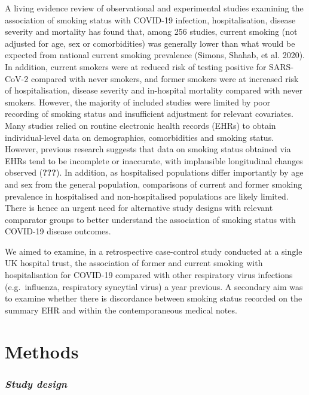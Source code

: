 \documentclass[
]{article}
\begin{document}
A living evidence review of observational and experimental studies
examining the association of smoking status with COVID-19 infection,
hospitalisation, disease severity and mortality has found that, among
256 studies, current smoking (not adjusted for age, sex or
comorbidities) was generally lower than what would be expected from
national current smoking prevalence (Simons, Shahab, et al. 2020). In
addition, current smokers were at reduced risk of testing positive for
SARS-CoV-2 compared with never smokers, and former smokers were at
increased risk of hospitalisation, disease severity and in-hospital
mortality compared with never smokers. However, the majority of included
studies were limited by poor recording of smoking status and
insufficient adjustment for relevant covariates. Many studies relied on
routine electronic health records (EHRs) to obtain individual-level data
on demographics, comorbidities and smoking status. However, previous
research suggests that data on smoking status obtained via EHRs tend to
be incomplete or inaccurate, with implausible longitudinal changes
observed ({\textbf{???}}). In addition, as hospitalised populations
differ importantly by age and sex from the general population,
comparisons of current and former smoking prevalence in hospitalised and
non-hospitalised populations are likely limited. There is hence an
urgent need for alternative study designs with relevant comparator
groups to better understand the association of smoking status with
COVID-19 disease outcomes.

We aimed to examine, in a retrospective case-control study conducted at
a single UK hospital trust, the association of former and current
smoking with hospitalisation for COVID-19 compared with other
respiratory virus infections (e.g.~influenza, respiratory syncytial
virus) a year previous. A secondary aim was to examine whether there is
discordance between smoking status recorded on the summary EHR and
within the contemporaneous medical notes.

\hypertarget{methods}{%
\section{\texorpdfstring{\textbf{Methods}}{Methods}}\label{methods}}

\hypertarget{study-design}{%
\subsubsection{\texorpdfstring{\emph{Study
design}}{Study design}}\label{study-design}}
\end{document}
